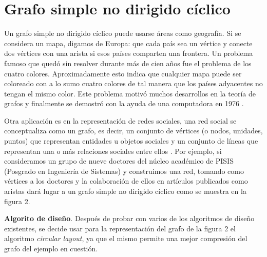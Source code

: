 \documentclass{article}
\begin{document}
\newpage
\section{Grafo simple no dirigido cíclico}
Un grafo simple no dirigido cíclico puede usarse áreas como geografía. Si se considera un mapa, digamos de Europa: que cada país sea un vértice y conecte dos vértices con una arista si esos países comparten una frontera. Un problema famoso que quedó sin resolver durante más de cien años fue el problema de los cuatro colores. Aproximadamente esto indica que cualquier mapa puede ser coloreado con a lo sumo cuatro colores de tal manera que los países adyacentes no tengan el mismo color. Este problema motivó muchos desarrollos en la teoría de grafos y finalmente se demostró con la ayuda de una computadora en 1976 \cite{rf1}.\linebreak

Otra aplicación es en la representación de redes sociales, una red social se conceptualiza como un grafo, es decir, un conjunto de vértices (o nodos, unidades, puntos) que representan entidades u objetos sociales y un conjunto de líneas que representan una o más relaciones sociales entre ellos \cite {article1}.\linebreak
Por ejemplo, si consideramos un grupo de nueve doctores del núcleo académico de PISIS (Posgrado en Ingeniería de Sistemas) y construimos una red, tomando como vértices a los doctores y la colaboración de ellos en artículos publicados como aristas dará lugar a un grafo simple no dirigido cíclico como se muestra en la figura 2.\linebreak

\textbf{Algorito de diseño}.\linebreak
Después de probar con varios de los algoritmos de diseño existentes, se decide usar para la representación del grafo de la figura 2 el algoritmo \textit{circular layout}, ya que el mismo permite una mejor compresión del grafo del ejemplo en cuestión.
\end{document}
